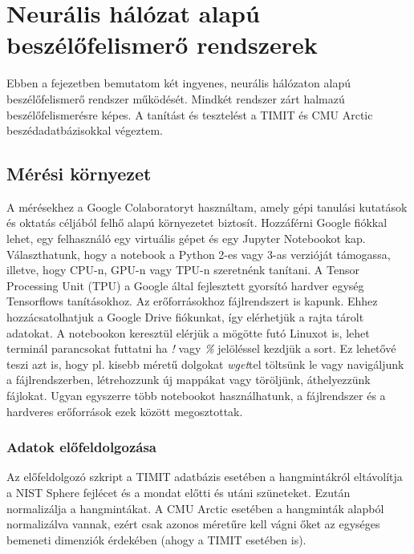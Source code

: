\chapter{Neurális hálózat alapú beszélőfelismerő rendszerek}

Ebben a fejezetben bemutatom két ingyenes, neurális hálózaton alapú beszélőfelismerő rendszer működését.
Mindkét rendszer zárt halmazú beszélőfelismerésre képes. A tanítást és tesztelést a TIMIT és CMU Arctic beszédadatbázisokkal végeztem.

\section{Mérési környezet}

A mérésekhez a Google Colaboratoryt használtam, amely gépi tanulási kutatások és oktatás céljából felhő alapú környezetet biztosít. Hozzáférni Google fiókkal lehet, egy felhasználó egy virtuális gépet és egy Jupyter Notebookot kap. Választhatunk, hogy  a notebook a Python 2-es vagy 3-as verzióját támogassa, illetve, hogy CPU-n, GPU-n vagy TPU-n szeretnénk tanítani. A Tensor Processing Unit (TPU) a Google által fejlesztett gyorsító hardver egység Tensorflows tanításokhoz.
\newline
\newline
Az erőforrásokhoz fájlrendszert is kapunk. Ehhez hozzácsatolhatjuk a Google Drive fiókunkat, így elérhetjük a rajta tárolt adatokat. A notebookon keresztül elérjük a mögötte futó Linuxot is, lehet terminál parancsokat futtatni ha \emph{!} vagy \emph{\%} jelöléssel kezdjük a sort. Ez lehetővé teszi azt is, hogy pl. kisebb méretű dolgokat \emph{wget}tel töltsünk le vagy navigáljunk a fájlrendszerben, létrehozzunk új mappákat vagy töröljünk, áthelyezzünk fájlokat. Ugyan egyszerre több notebookot használhatunk, a fájlrendszer és a hardveres erőforrások ezek között megosztottak.

\subsection{Adatok előfeldolgozása}

Az előfeldolgozó szkript a TIMIT adatbázis esetében a hangmintákról eltávolítja a NIST Sphere fejlécet és a mondat előtti és utáni szüneteket. Ezután normalizálja a hangmintákat. A CMU Arctic esetében a hangminták alapból normalizálva vannak, ezért csak azonos méretűre kell vágni őket az egységes bemeneti dimenziók érdekében (ahogy a TIMIT esetében is).

